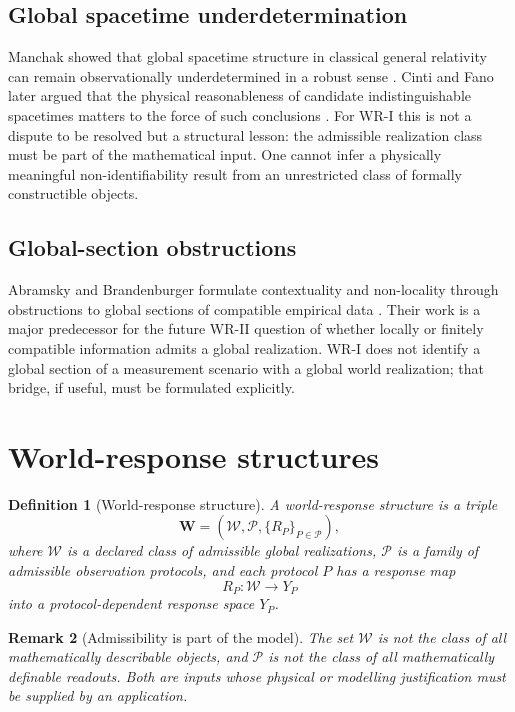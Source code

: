 \documentclass[11pt]{article}
\newtheorem{definition}{Definition}[section]
\newtheorem{remark}[definition]{Remark}
\newcommand{\W}{\mathcal W}
\newcommand{\Pcal}{\mathcal P}
\begin{document}
\subsection{Global spacetime underdetermination}

Manchak showed that global spacetime structure in classical general relativity
can remain observationally underdetermined in a robust sense
\cite{Manchak2009}. Cinti and Fano later argued that the physical
reasonableness of candidate indistinguishable spacetimes matters to the force
of such conclusions \cite{CintiFano2021}. For WR-I this is not a dispute to be
resolved but a structural lesson: the admissible realization class must be
part of the mathematical input. One cannot infer a physically meaningful
non-identifiability result from an unrestricted class of formally constructible
objects.

\subsection{Global-section obstructions}

Abramsky and Brandenburger formulate contextuality and non-locality through
obstructions to global sections of compatible empirical data
\cite{AbramskyBrandenburger2011}. Their work is a major predecessor for the
future WR-II question of whether locally or finitely compatible information
admits a global realization. WR-I does not identify a global section of a
measurement scenario with a global world realization; that bridge, if useful,
must be formulated explicitly.

\section{World-response structures}

\begin{definition}[World-response structure]
A \emph{world-response structure} is a triple
\[
\mathbf W=(\W,\Pcal,\{R_P\}_{P\in\Pcal}),
\]
where $\W$ is a declared class of \emph{admissible global realizations},
$\Pcal$ is a family of admissible observation protocols, and each protocol
$P$ has a response map
\[
R_P:\W\to Y_P
\]
into a protocol-dependent response space $Y_P$.
\end{definition}

\begin{remark}[Admissibility is part of the model]
The set $\W$ is not the class of all mathematically describable objects, and
$\Pcal$ is not the class of all mathematically definable readouts. Both are
inputs whose physical or modelling justification must be supplied by an
application.
\end{remark}
\end{document}
